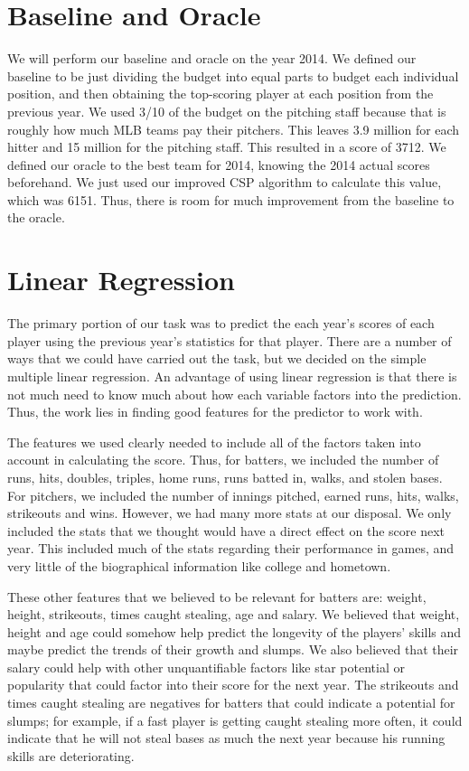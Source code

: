 \documentclass[12pt]{amsart}
\begin{document}
\section{\large Baseline and Oracle}
We will perform our baseline and oracle on the year 2014. We defined our baseline to be just dividing the budget into equal parts to budget each individual position, and then obtaining the top-scoring player at each position from the previous year. We used 3/10 of the budget on the pitching staff because that is roughly how much MLB teams pay their pitchers. This leaves 3.9 million for each hitter and 15 million for the pitching staff. This resulted in a score of 3712. We defined our oracle to the best team for 2014, knowing the 2014 actual scores beforehand. We just used our improved CSP algorithm to calculate this value, which was 6151. Thus, there is room for much improvement from the baseline to the oracle.

\section{\large Linear Regression}
The primary portion of our task was to predict the each year's scores of each player using the previous year's statistics for that player. There are a number of ways that we could have carried out the task, but we decided on the simple multiple linear regression. An advantage of using linear regression is that there is not much need to know much about how each variable factors into the prediction. Thus, the work lies in finding good features for the predictor to work with.
\vspace{.4cm}

The features we used clearly needed to include all of the factors taken into account in calculating the score. Thus, for batters, we included the number of runs, hits, doubles, triples, home runs, runs batted in, walks, and stolen bases. For pitchers, we included the number of innings pitched, earned runs, hits, walks, strikeouts and wins. However, we had many more stats at our disposal. We only included the stats that we thought would have a direct effect on the score next year. This included much of the stats regarding their performance in games, and very little of the biographical information like college and hometown. 
\vspace{.4cm}

These other features that we believed to be relevant for batters are: weight, height, strikeouts, times caught stealing, age and salary. We believed that weight, height and age could somehow help predict the longevity of the players' skills and maybe predict the trends of their growth and slumps. We also believed that their salary could help with other unquantifiable factors like star potential or popularity that could factor into their score for the next year. The strikeouts and times caught stealing are negatives for batters that could indicate a potential for slumps; for example, if a fast player is getting caught stealing more often, it could indicate that he will not steal bases as much the next year because his running skills are deteriorating. 
\vspace{.4cm}
\end{document}
